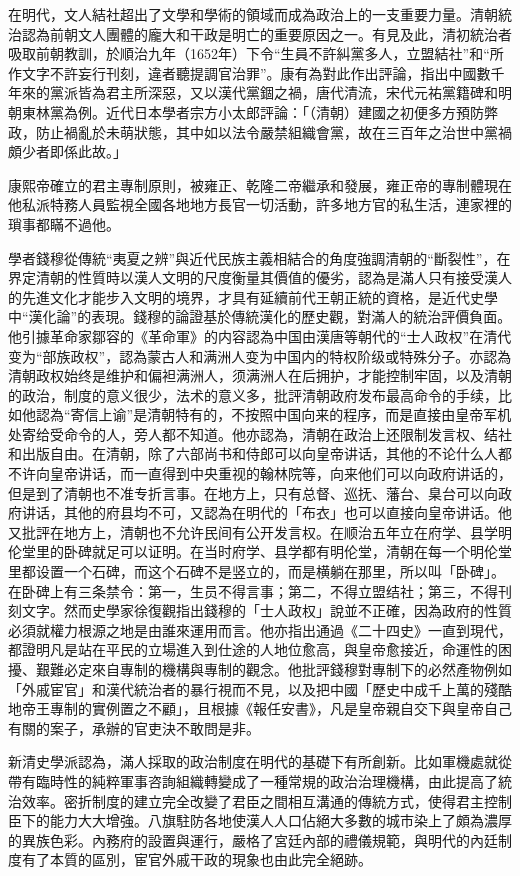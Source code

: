 在明代，文人結社超出了文學和學術的領域而成為政治上的一支重要力量。清朝統治認為前朝文人團體的龐大和干政是明亡的重要原因之一。有見及此，清初統治者吸取前朝教訓，於順治九年（1652年）下令“生員不許糾黨多人，立盟結社”和“所作文字不許妄行刊刻，違者聽提調官治罪”。康有為對此作出評論，指出中國數千年來的黨派皆為君主所深惡，又以漢代黨錮之禍，唐代清流，宋代元祐黨籍碑和明朝東林黨為例。近代日本學者宗方小太郎評論：「（清朝）建國之初便多方預防弊政，防止禍亂於未萌狀態，其中如以法令嚴禁組織會黨，故在三百年之治世中黨禍頗少者即係此故。」

康熙帝確立的君主專制原則，被雍正、乾隆二帝繼承和發展，雍正帝的專制體現在他私派特務人員監視全國各地地方長官一切活動，許多地方官的私生活，連家裡的瑣事都瞞不過他。

學者錢穆從傳統“夷夏之辨”與近代民族主義相結合的角度強調清朝的“斷裂性”，在界定清朝的性質時以漢人文明的尺度衡量其價值的優劣，認為是滿人只有接受漢人的先進文化才能步入文明的境界，才具有延續前代王朝正統的資格，是近代史學中“漢化論”的表現。錢穆的論證基於傳統漢化的歷史觀，對滿人的統治評價負面。他引據革命家鄒容的《革命軍》的内容認為中国由漢唐等朝代的“士人政权”在清代变为“部族政权”，認為蒙古人和满洲人变为中国内的特权阶级或特殊分子。亦認為清朝政权始终是维护和偏袒满洲人，须满洲人在后拥护，才能控制牢固，以及清朝的政治，制度的意义很少，法术的意义多，批評清朝政府发布最高命令的手续，比如他認為“寄信上谕”是清朝特有的，不按照中国向来的程序，而是直接由皇帝军机处寄给受命令的人，旁人都不知道。他亦認為，清朝在政治上还限制发言权、结社和出版自由。在清朝，除了六部尚书和侍郎可以向皇帝讲话，其他的不论什么人都不许向皇帝讲话，而一直得到中央重视的翰林院等，向来他们可以向政府讲话的，但是到了清朝也不准专折言事。在地方上，只有总督、巡抚、藩台、臬台可以向政府讲话，其他的府县均不可，又認為在明代的「布衣」也可以直接向皇帝讲话。他又批評在地方上，清朝也不允许民间有公开发言权。在顺治五年立在府学、县学明伦堂里的卧碑就足可以证明。在当时府学、县学都有明伦堂，清朝在每一个明伦堂里都设置一个石碑，而这个石碑不是竖立的，而是横躺在那里，所以叫「卧碑」。在卧碑上有三条禁令：第一，生员不得言事；第二，不得立盟结社；第三，不得刊刻文字。然而史學家徐復觀指出錢穆的「士人政权」說並不正確，因為政府的性質必須就權力根源之地是由誰來運用而言。他亦指出通過《二十四史》一直到現代，都證明凡是站在平民的立場進入到仕途的人地位愈高，與皇帝愈接近，命運性的困擾、艱難必定來自專制的機構與專制的觀念。他批評錢穆對專制下的必然產物例如「外戚宦官」和漢代統治者的暴行視而不見，以及把中國「歷史中成千上萬的殘酷地帝王專制的實例置之不顧」，且根據《報任安書》，凡是皇帝親自交下與皇帝自己有關的案子，承辦的官吏決不敢問是非。

新清史學派認為，滿人採取的政治制度在明代的基礎下有所創新。比如軍機處就從帶有臨時性的純粹軍事咨詢組織轉變成了一種常規的政治治理機構，由此提高了統治效率。密折制度的建立完全改變了君臣之間相互溝通的傳統方式，使得君主控制臣下的能力大大增強。八旗駐防各地使漢人人口佔絕大多數的城市染上了頗為濃厚的異族色彩。內務府的設置與運行，嚴格了宮廷內部的禮儀規範，與明代的內廷制度有了本質的區別，宦官外戚干政的現象也由此完全絕跡。


